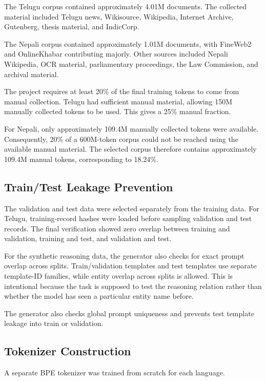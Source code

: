 \documentclass[10pt,a4paper]{article}
\begin{document}
The Telugu corpus contained approximately 4.01M documents. The
collected material included Telugu news, Wikisource, Wikipedia,
Internet Archive, Gutenberg, thesis material, and IndicCorp.

The Nepali corpus contained approximately 1.01M documents, with
FineWeb2 and OnlineKhabar contributing majorly. Other sources
included Nepali Wikipedia, OCR material, parliamentary proceedings,
the Law Commission, and archival material.

The project requires at least 20\% of the final training tokens to
come from manual collection. Telugu had sufficient manual material,
allowing 150M manually collected tokens to be used. This gives a 25\%
manual fraction.

For Nepali, only approximately 109.4M manually collected tokens were
available. Consequently, 20\% of a 600M-token corpus could not be
reached using the available manual material. The selected corpus
therefore contains approximately 109.4M manual tokens, corresponding
to 18.24\%.

\subsection{Train/Test Leakage Prevention}

The validation and test data were selected separately from the
training data. For Telugu, training-record hashes were loaded before
sampling validation and test records. The final verification showed
zero overlap between training and validation, training and test, and
validation and test.

For the synthetic reasoning data, the generator also checks for
exact prompt overlap across splits. Train/validation templates and
test templates use separate template-ID families, while entity
overlap across splits is allowed. This is intentional because the
task is supposed to test the reasoning relation rather than whether
the model has seen a particular entity name before.

The generator also checks global prompt uniqueness and prevents test
template leakage into train or validation.

\subsection{Tokenizer Construction}

A separate BPE tokenizer was trained from scratch for each language.
\end{document}
